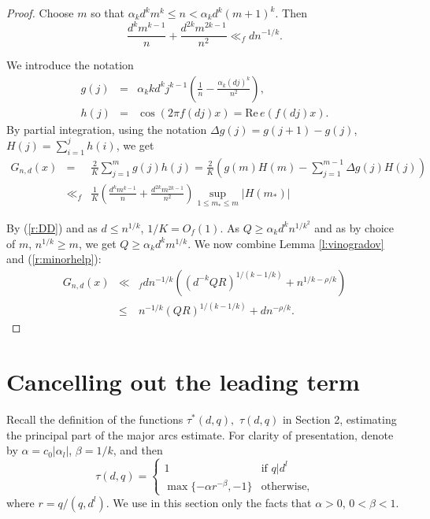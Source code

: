 \documentclass{amsart}
\numberwithin {equation}{section}
\begin{document}
\begin{proof}
Choose $m$ so that $\alpha _{k}d^{k}m^{k}\leq n<\alpha _{k}d^{k}(m+1)^{k}$.
Then 
\begin{equation}
\frac{d^{k}m^{k-1}}{n}+\frac{d^{2k}m^{2k-1}}{n^{2}}\ll _{f}dn^{-1/k}{\text {.}}  \label{r:minorhelp}
\end{equation}

We introduce the notation 
\begin{eqnarray*}
g(j)&=&\alpha _{k}kd^{k}j^{k-1}\left (\frac{1}{n}-\frac{\alpha _{k}(dj)^{k}}{n^{2}}\right ), \\
h(j)&=&\cos (2\pi f(dj)x)={\mathrm{Re}}\,e(f(dj)x){\text {.}}
\end{eqnarray*}
By partial integration, using the notation $\Delta g(j)=g(j+1)-g(j)$, $H(j)=\sum _{i=1}^{j}h(i)$, we get 
\begin{eqnarray*}
G_{n,d}(x)&=&\frac{2}{K}\sum _{j=1}^{m}g(j)h(j)=\frac{2}{K}\left
(g(m)H(m)-\sum _{j=1}^{m-1}\Delta g(j)H(j)\right ) \\
&\ll _{f}&\frac{1}{K}\left (\frac{d^{k}m^{k-1}}{n}+\frac{d^{2k}m^{2k-1}}{n^{2}}\right )\sup _{1\leq m_*\leq m}|H(m_*)|
\end{eqnarray*}

By (\ref{r:DD}) and as $d\leq n^{1/k}$, $1/K=O_{f}(1)$. As $Q\geq \alpha
_{k}d^{k}n^{1/k^{2}}$ and as by choice of $m$, $n^{1/k}\geq m$, we get $Q\geq \alpha _{k}d^{k}m^{1/k}$. We now combine Lemma \ref{l:vinogradov} and (\ref{r:minorhelp}): 
\begin{eqnarray*}
G_{n,d}(x) &\ll &_{f}dn^{-1/k}\left( \left( d^{-k}QR\right)
^{1/(k-1/k)}+n^{1/k-\rho /k}\right) \\
&\leq &n^{-1/k}\left( QR\right) ^{1/(k-1/k)}+dn^{-\rho /k}.
\end{eqnarray*}
\end{proof}

\section{Cancelling out the leading term}

Recall the definition of the functions $\tau ^{\ast }(d,q),$ $\tau (d,q)$ in
Section 2, estimating the principal part of the major arcs estimate. For
clarity of presentation, denote by $\alpha =c_{0}|\alpha _{l}|$, $\beta =1/k$, and then 
\begin{equation*}
\tau (d,q)=\left\{ 
\begin{array}{ll}
1 & \text{if }q|d^{l} \\ 
\max \{-\alpha r^{-\beta },-1\} & \text{otherwise,}\end{array}\right.
\end{equation*}where $r=q/(q,d^{l})$. We use in this section only the facts that $\alpha >0$, $0<\beta <1$.
\end{document}
